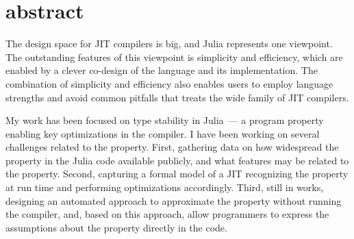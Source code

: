 \documentclass[oneside,openright,titlepage,numbers=noenddot,%
headinclude,footinclude,cleardoublepage=empty,abstract=on,
BCOR=5mm,paper=a4,fontsize=11pt,
dvipsnames
]{scrreprt}
\begin{document}
\frenchspacing
\raggedbottom

\pagestyle{plain}



\chapter*{abstract}
The design space for JIT compilers is big, and Julia represents one viewpoint.
The outstanding features of this viewpoint is simplicity and efficiency, which
are enabled by a clever co-design of the language and its implementation.
The combination of simplicity and efficiency also enables users to employ
language strengths and avoid common pitfalls that treats the wide family of JIT
compilers.

My work has been focused on type stability in Julia~--- a program property
enabling key optimizations in the compiler. I have been working on several
challenges related to the property. First, gathering data on how widespread the
property in the Julia code available publicly, and what features may be related
to the property. Second, capturing a formal model of a JIT recognizing the
property at run time and performing optimizations accordingly. Third, still in
works, designing an automated approach to approximate the property without
running the compiler, and, based on this approach, allow programmers to express
the assumptions about the property directly in the code.


\pagestyle{scrheadings}
{}
\setcounter{tocdepth}{2} %
\setcounter{secnumdepth}{3} %
\manualmark
\markboth{\spacedlowsmallcaps{\contentsname}}{\spacedlowsmallcaps{\contentsname}}
\tableofcontents
{}
\renewcommand{\chaptermark}[1]{\markboth{\spacedlowsmallcaps{#1}}{\spacedlowsmallcaps{#1}}}
\renewcommand{\sectionmark}[1]{\markright{\textsc{\thesection}\enspace\spacedlowsmallcaps{#1}}}
\end{document}
